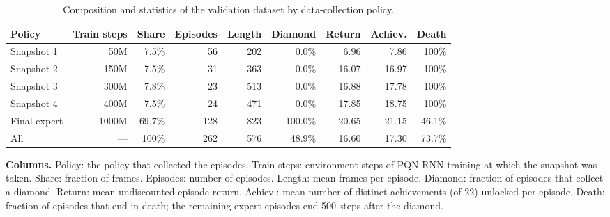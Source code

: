 \begin{table}[H]
\centering
\caption{Composition and statistics of the validation dataset by data-collection policy.}
\label{tab:data-val}
\small
\setlength{\tabcolsep}{3.5pt}
\begin{tabular}{lrrrrrrrr}
\toprule
Policy & Train steps & Share & Episodes & Length & Diamond & Return & Achiev. & Death \\
\midrule
Snapshot 1 & 50M & 7.5\% & 56 & 202 & 0.0\% & 6.96 & 7.86 & 100\% \\
Snapshot 2 & 150M & 7.5\% & 31 & 363 & 0.0\% & 16.07 & 16.97 & 100\% \\
Snapshot 3 & 300M & 7.8\% & 23 & 513 & 0.0\% & 16.88 & 17.78 & 100\% \\
Snapshot 4 & 400M & 7.5\% & 24 & 471 & 0.0\% & 17.85 & 18.75 & 100\% \\
Final expert & 1000M & 69.7\% & 128 & 823 & 100.0\% & 20.65 & 21.15 & 46.1\% \\
\midrule
All & --- & 100\% & 262 & 576 & 48.9\% & 16.60 & 17.30 & 73.7\% \\
\bottomrule
\end{tabular}

\vspace{4pt}
\begin{minipage}{\linewidth}
\footnotesize\raggedright
\textbf{Columns.} Policy: the policy that collected the episodes. Train steps: environment steps of PQN-RNN training at which the snapshot was taken. Share: fraction of frames. Episodes: number of episodes. Length: mean frames per episode. Diamond: fraction of episodes that collect a diamond. Return: mean undiscounted episode return. Achiev.: mean number of distinct achievements (of 22) unlocked per episode. Death: fraction of episodes that end in death; the remaining expert episodes end 500 steps after the diamond.
\end{minipage}
\end{table}

